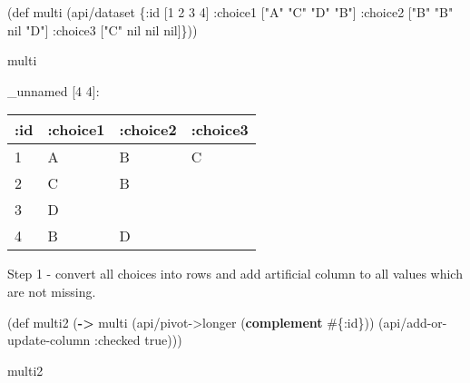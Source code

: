 \documentclass[]{article}
\newenvironment{Shaded}{\begin{snugshade}}{\end{snugshade}}
\newcommand{\KeywordTok}[1]{\textcolor[rgb]{0.13,0.29,0.53}{\textbf{#1}}}
\newcommand{\DecValTok}[1]{\textcolor[rgb]{0.00,0.00,0.81}{#1}}
\newcommand{\StringTok}[1]{\textcolor[rgb]{0.31,0.60,0.02}{#1}}
\newcommand{\FunctionTok}[1]{\textcolor[rgb]{0.00,0.00,0.00}{#1}}
\newcommand{\VariableTok}[1]{\textcolor[rgb]{0.00,0.00,0.00}{#1}}
\newcommand{\BuiltInTok}[1]{#1}
\newcommand{\AttributeTok}[1]{\textcolor[rgb]{0.77,0.63,0.00}{#1}}
\newcommand{\NormalTok}[1]{#1}
\begin{document}
\begin{Shaded}
\begin{Highlighting}[]
\NormalTok{(}\BuiltInTok{def}\FunctionTok{ multi }\NormalTok{(api/dataset \{}\AttributeTok{:id}\NormalTok{ [}\DecValTok{1} \DecValTok{2} \DecValTok{3} \DecValTok{4}\NormalTok{]}
                         \AttributeTok{:choice1}\NormalTok{ [}\StringTok{"A"} \StringTok{"C"} \StringTok{"D"} \StringTok{"B"}\NormalTok{]}
                         \AttributeTok{:choice2}\NormalTok{ [}\StringTok{"B"} \StringTok{"B"} \VariableTok{nil} \StringTok{"D"}\NormalTok{]}
                         \AttributeTok{:choice3}\NormalTok{ [}\StringTok{"C"} \VariableTok{nil} \VariableTok{nil} \VariableTok{nil}\NormalTok{]\}))}
\end{Highlighting}
\end{Shaded}

\begin{Shaded}
\begin{Highlighting}[]
\NormalTok{multi}
\end{Highlighting}
\end{Shaded}

\_unnamed {[}4 4{]}:

\begin{longtable}[]{@{}llll@{}}
\toprule
:id & :choice1 & :choice2 & :choice3\tabularnewline
\midrule
\endhead
1 & A & B & C\tabularnewline
2 & C & B &\tabularnewline
3 & D & &\tabularnewline
4 & B & D &\tabularnewline
\bottomrule
\end{longtable}

Step 1 - convert all choices into rows and add artificial column to all
values which are not missing.

\begin{Shaded}
\begin{Highlighting}[]
\NormalTok{(}\BuiltInTok{def}\FunctionTok{ multi2 }\NormalTok{(}\KeywordTok{->}\NormalTok{ multi}
\NormalTok{                (api/pivot->longer (}\KeywordTok{complement}\NormalTok{ #\{}\AttributeTok{:id}\NormalTok{\}))}
\NormalTok{                (api/add-or-update-column }\AttributeTok{:checked} \VariableTok{true}\NormalTok{)))}
\end{Highlighting}
\end{Shaded}

\begin{Shaded}
\begin{Highlighting}[]
\NormalTok{multi2}
\end{Highlighting}
\end{Shaded}
\end{document}
